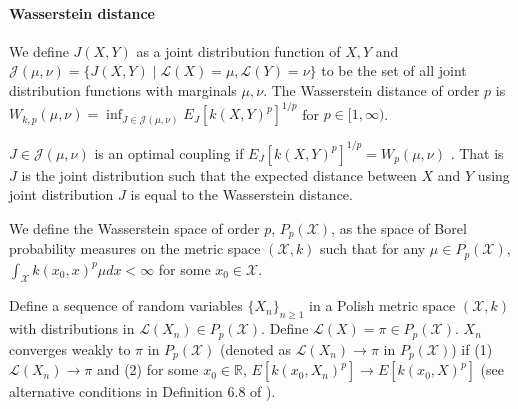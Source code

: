 \documentclass[12pt]{article}
\theoremstyle{plain}%
\theoremstyle{definition}
\begin{document}


\paragraph{Wasserstein distance} We define $J(X,Y)$ as a joint distribution function of $X,Y$ and $\mathcal{J}(\mu,\nu)=\{J(X,Y)\mid \mathcal{L}(X)=\mu, \mathcal{L}(Y)=\nu \}$ to be the set of all joint distribution functions with marginals $\mu,\nu$. 
 The Wasserstein distance of order $p$ is 
$W_{k,p}(\mu,\nu)=\inf_{J\in \mathcal{J}(\mu,\nu)}E_J[k(X,Y)^p]^{1/p}$ for $p\in [1,\infty)$.

$J\in \mathcal{J}(\mu,\nu)$ is an optimal coupling if $E_J[k(X,Y)^p]^{1/p}=W_{p}(\mu,\nu)$ \cite{villani}. That is $J$ is the joint distribution such that the expected distance between $X$ and $Y$ using joint distribution $J$ is equal to the Wasserstein distance.

We define the Wasserstein space of order $p$, $P_p(\mathcal{X})$, as the space of Borel probability measures on the metric space $(\mathcal{X},k)$ such that for any $\mu\in P_p(\mathcal{X})$, $\int_{\mathcal{X}}k(x_0,x)^p
\mu dx <\infty$ for some $x_0\in \mathcal{X}$.

Define a sequence of random variables $\{X_n\}_{n\geq 1}$ in a Polish metric space $(\mathcal{X},k)$ with distributions in $\mathcal{L}(X_n)\in P_p(\mathcal{X})$. Define $\mathcal{L}(X)=\pi\in P_p(\mathcal{X})$. $X_n$ converges weakly to $\pi$ in $P_p(\mathcal{X})$ (denoted as $\mathcal{L}(X_n)\to \pi$ in $P_p(\mathcal{X})$) if (1) $\mathcal{L}(X_n)\to \pi$ and (2) for some $x_0\in \mathbb{R}$, $E[k(x_0,X_n)^p]\to E[k(x_0,X)^p]$ (see alternative conditions in Definition 6.8 of \cite{villani}).
\end{document}
